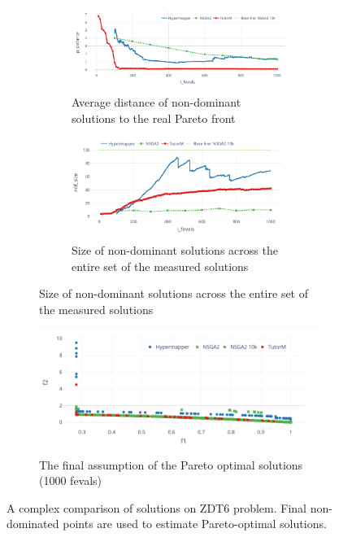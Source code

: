    \begin{figure}
        \centering
        \begin{subfigure}{\textwidth}
            \begin{subfigure}{0.45\textwidth}
                \includegraphics[width=\textwidth]{content/images/zdt6_dist}
                \caption{Average distance of non-dominant solutions to the real Pareto front}
                \label{fig:zdt6_dist}
            \end{subfigure} 
            \begin{subfigure}{0.45\textwidth}
                \includegraphics[width=\textwidth]{content/images/zdt6_ndf}
                \caption{Size of non-dominant solutions across the entire set of the measured solutions}
                \label{fig:zdt6_ndf}
            \end{subfigure} 
        \end{subfigure} 

        \begin{subfigure}{\textwidth}
            \includegraphics[width=\textwidth]{content/images/zdt6_front}
            \caption{The final assumption of the Pareto optimal solutions (1000 fevals)}
            \label{fig:zdt6_front}
        \end{subfigure} 
        \caption[Comparison of solutions on ZDT6 problem]{A complex comparison of solutions on ZDT6 problem. Final non-dominated points are used to estimate Pareto-optimal solutions.}
        \label{fig:changing_models}    
    \end{figure}
